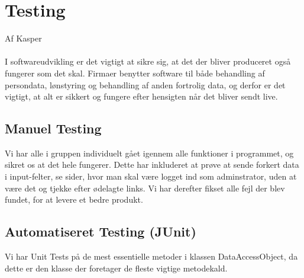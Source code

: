 \section{Testing}
Af Kasper\\\\

I softwareudvikling er det vigtigt at sikre sig, at det der bliver produceret også fungerer som det skal. Firmaer benytter software til både behandling af persondata, lønstyring og behandling af anden fortrolig data, og derfor er det vigtigt, at alt er sikkert og fungere efter hensigten når det bliver sendt live.

\subsection{Manuel Testing}
Vi har alle i gruppen individuelt gået igennem alle funktioner i programmet, og sikret os at det hele fungerer. Dette har inkluderet at prøve at sende forkert data i input-felter, se sider, hvor man skal være logget ind som adminstrator, uden at være det og tjekke efter ødelagte links. Vi har derefter fikset alle fejl der blev fundet, for at levere et bedre produkt.\\
\subsection{Automatiseret Testing (JUnit)}
Vi har Unit Tests på de mest essentielle metoder i klassen DataAccessObject, da dette er den klasse der foretager de fleste vigtige metodekald.